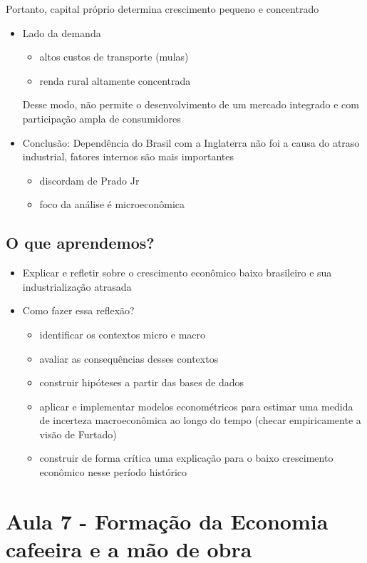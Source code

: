 \documentclass[a4paper,12pt]{article}[abntex2]
\begin{document}
Portanto, capital próprio determina crescimento pequeno e concentrado 
\begin{itemize}
    \item Lado da demanda 
    \begin{itemize}
        \item altos custos de transporte (mulas)
        \item renda rural altamente concentrada 

    \end{itemize}

Desse modo, não permite o desenvolvimento de um mercado integrado e com participação ampla de consumidores 

    \item Conclusão: Dependência do Brasil com a Inglaterra não foi a causa do atraso industrial, fatores internos são mais importantes
    \begin{itemize}
        \item discordam de Prado Jr
        \item foco da análise é microeconômica 
    \end{itemize}
\end{itemize}
\subsection{\textbf{O que aprendemos?}}
\begin{itemize}
    \item Explicar e refletir sobre o crescimento econômico baixo brasileiro e sua industrialização atrasada
    \item  Como fazer essa reflexão?
\begin{itemize}
    \item identificar os contextos micro e macro
    \item avaliar as consequências desses contextos
    \item  construir hipóteses a partir das bases de dados
    \item aplicar e implementar modelos econométricos para estimar uma medida de incerteza macroeconômica ao longo do tempo (checar empiricamente a visão de Furtado)
\item construir de forma crítica uma explicação para o baixo crescimento econômico nesse período histórico
\end{itemize}
\end{itemize}
\newpage
\section{\textbf{Aula 7 - Formação da Economia cafeeira e a mão de obra}}
\end{document}
